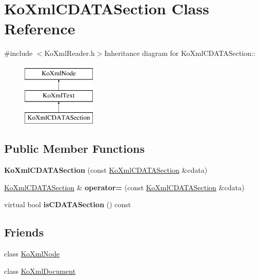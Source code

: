 \hypertarget{classKoXmlCDATASection}{
\section{KoXmlCDATASection Class Reference}
\label{classKoXmlCDATASection}
}


{\ttfamily \#include $<$KoXmlReader.h$>$}Inheritance diagram for KoXmlCDATASection::\begin{figure}[H]
\begin{center}
\leavevmode
\includegraphics[height=3cm]{classKoXmlCDATASection}
\end{center}
\end{figure}
\subsection*{Public Member Functions}
\begin{DoxyCompactItemize}
\item 
\hypertarget{classKoXmlCDATASection_a9f69382bc27884731599f49763926343}{
{\bfseries KoXmlCDATASection} (const \hyperlink{classKoXmlCDATASection}{KoXmlCDATASection} \&cdata)}
\label{classKoXmlCDATASection_a9f69382bc27884731599f49763926343}

\item 
\hypertarget{classKoXmlCDATASection_a2380c3e02c07e9f31ee30c97de202c06}{
\hyperlink{classKoXmlCDATASection}{KoXmlCDATASection} \& {\bfseries operator=} (const \hyperlink{classKoXmlCDATASection}{KoXmlCDATASection} \&cdata)}
\label{classKoXmlCDATASection_a2380c3e02c07e9f31ee30c97de202c06}

\item 
\hypertarget{classKoXmlCDATASection_af5d118d633fa233c8a7c9a3fad7ae5fd}{
virtual bool {\bfseries isCDATASection} () const }
\label{classKoXmlCDATASection_af5d118d633fa233c8a7c9a3fad7ae5fd}

\end{DoxyCompactItemize}
\subsection*{Friends}
\begin{DoxyCompactItemize}
\item 
\hypertarget{classKoXmlCDATASection_a6c97883f92c7cbf2ecdf17db6cea8297}{
class \hyperlink{classKoXmlCDATASection_a6c97883f92c7cbf2ecdf17db6cea8297}{KoXmlNode}}
\label{classKoXmlCDATASection_a6c97883f92c7cbf2ecdf17db6cea8297}

\item 
\hypertarget{classKoXmlCDATASection_a7f0a67ef52ddc6542737225a82e4f487}{
class \hyperlink{classKoXmlCDATASection_a7f0a67ef52ddc6542737225a82e4f487}{KoXmlDocument}}
\label{classKoXmlCDATASection_a7f0a67ef52ddc6542737225a82e4f487}

\end{DoxyCompactItemize}


